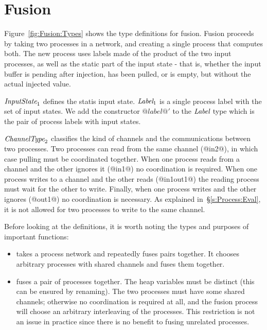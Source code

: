 \section{Fusion}
\label{s:Fusion}




Figure~\ref{fig:Fusion:Types} shows the type definitions for fusion.
Fusion proceeds by taking two processes in a network, and creating a single process that computes both.
The new process uses labels made of the product of the two input processes, as well as the static part of the input state - that is, whether the input buffer is pending after injection, has been pulled, or is empty, but without the actual injected value.


$\textit{InputState}_1$ defines the statis input state. $\textit{Label}_1$ is a single process label with the set of input states. We add the constructor $@label@'$ to the $\textit{Label}$ type which is the pair of process labels with input states.

$\textit{ChannelType}_2$ classifies the kind of channels and the communications between two processes.
Two processes can read from the same channel (@in2@), in which case pulling must be coordinated together.
When one process reads from a channel and the other ignores it (@in1@) no coordination is required.
When one process writes to a channel and the other reads (@in1out1@) the reading process must wait for the other to write.
Finally, when one process writes and the other ignores (@out1@) no coordination is necessary.
As explained in~\S\ref{s:Process:Eval}, it is not allowed for two processes to write to the same channel.

Before looking at the definitions, it is worth noting the types and purposes of important functions:
\begin{itemize}
\item
{} takes a process network and repeatedly fuses pairs together. 
It chooses arbitrary processes with shared channels and fuses them together.

\item
{} fuses a pair of processes together.
The heap variables must be distinct (this can be ensured by renaming).
The two processes must have some shared channels; otherwise no coordination is required at all, and the fusion process will choose an arbitrary interleaving of the processes.
This restriction is not an issue in practice since there is no benefit to fusing unrelated processes.
\end{itemize}


